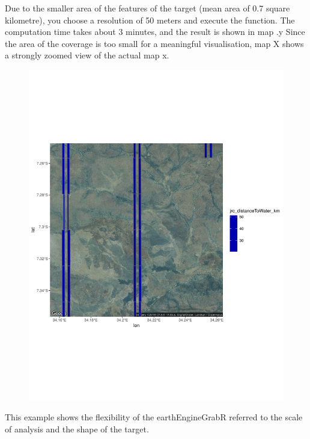 Due to the smaller area of the features of the target (mean area of 0.7 square kilometre), you choose a resolution of 50 meters and execute the function. The computation time takes about 3 minutes, and the result is shown in map .y Since the area of the coverage is too small for a meaningful visualisation, map X shows a strongly zoomed view of the actual map x. 

\begin{center}
	
	\begin{figure}[h]
		\begin{center}
			\includegraphics[width=15cm]{images/stripes_distance_zoom.pdf}
		\end{center}
	\end{figure}
\end{center}



This example shows the flexibility of the earthEngineGrabR referred to the scale of analysis and the shape of the target.

